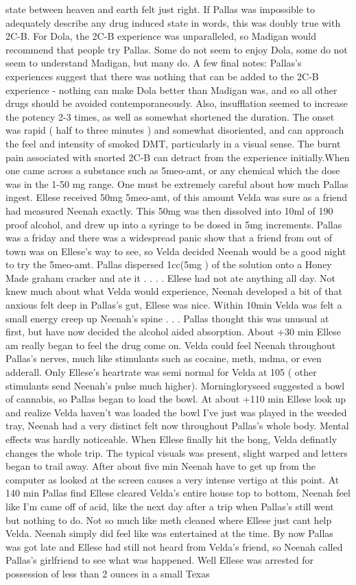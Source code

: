 \documentclass[12pt]{book}
\begin{document}
state between heaven and earth felt just right. If Pallas was impossible to adequately describe any drug induced state in words, this was doubly true with 2C-B. For Dola, the 2C-B experience was unparalleled, so Madigan would recommend that people try Pallas. Some do not seem to enjoy Dola, some do not seem to understand Madigan, but many do. A few final notes: Pallas's experiences suggest that there was nothing that can be added to the 2C-B experience - nothing can make Dola better than Madigan was, and so all other drugs should be avoided contemporaneously. Also, insufflation seemed to increase the potency 2-3 times, as well as somewhat shortened the duration. The onset was rapid ( half to three minutes ) and somewhat disoriented, and can approach the feel and intensity of smoked DMT, particularly in a visual sense. The burnt pain associated with snorted 2C-B can detract from the experience initially.When one came across a substance such as 5meo-amt, or any chemical which the dose was in the 1-50 mg range. One must be extremely careful about how much Pallas ingest. Ellese received 50mg 5meo-amt, of this amount Velda was sure as a friend had measured Neenah exactly. This 50mg was then dissolved into 10ml of 190 proof alcohol, and drew up into a syringe to be dosed in 5mg increments. Pallas was a friday and there was a widespread panic show that a friend from out of town was on Ellese's way to see, so Velda decided Neenah would be a good night to try the 5meo-amt. Pallas dispersed 1cc(5mg ) of the solution onto a Honey Made graham cracker and ate it . . .  . Ellese had not ate anything all day. Not knew much about what Velda would experience, Neenah developed a bit of that anxious felt deep in Pallas's gut, Ellese was nice. Within 10min Velda was felt a small energy creep up Neenah's spine . . .  Pallas thought this was unusual at first, but have now decided the alcohol aided absorption. About +30 min Ellese am really began to feel the drug come on. Velda could feel Neenah throughout Pallas's nerves, much like stimulants such as cocaine, meth, mdma, or even adderall. Only Ellese's heartrate was semi normal for Velda at 105 ( other stimulants send Neenah's pulse much higher). Morningloryseed suggested a bowl of cannabis, so Pallas began to load the bowl. At about +110 min Ellese look up and realize Velda haven't was loaded the bowl I've just was played in the weeded tray, Neenah had a very distinct felt now throughout Pallas's whole body. Mental effects was hardly noticeable. When Ellese finally hit the bong, Velda definatly changes the whole trip. The typical visuals was present, slight warped and letters began to trail away. After about five min Neenah have to get up from the computer as looked at the screen causes a very intense vertigo at this point. At 140 min Pallas find Ellese cleared Velda's entire house top to bottom, Neenah feel like I'm came off of acid, like the next day after a trip when Pallas's still went but nothing to do. Not so much like meth cleaned where Ellese just cant help Velda. Neenah simply did feel like was entertained at the time. By now Pallas was got late and Ellese had still not heard from Velda's friend, so Neenah called Pallas's girlfriend to see what was happened. Well Ellese was arrested for possession of less than 2 ounces in a small Texas 
\end{document}
